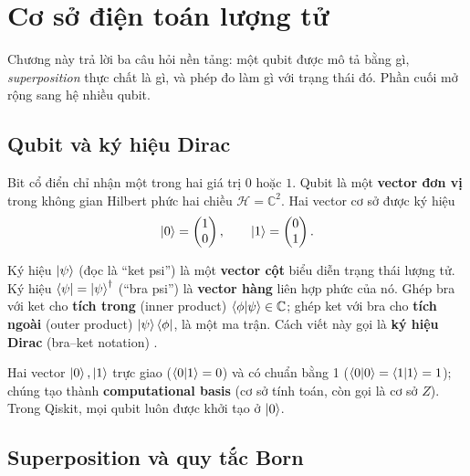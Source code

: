 \section{Cơ sở điện toán lượng tử}
\label{sec:basics}

Chương này trả lời ba câu hỏi nền tảng: một qubit được mô tả bằng gì, \emph{superposition} thực chất
là gì, và phép đo làm gì với trạng thái đó. Phần cuối mở rộng sang hệ nhiều qubit.

\subsection{Qubit và ký hiệu Dirac}

Bit cổ điển chỉ nhận một trong hai giá trị $0$ hoặc $1$. Qubit là một \textbf{vector đơn vị} trong
không gian Hilbert phức hai chiều $\mathcal{H} = \mathbb{C}^2$. Hai vector cơ sở được ký hiệu
\begin{equation}
  \ket{0} = \begin{pmatrix}1\\0\end{pmatrix}, \qquad
  \ket{1} = \begin{pmatrix}0\\1\end{pmatrix}.
  \label{eq:basis}
\end{equation}

\begin{definition}
Ký hiệu $\ket{\psi}$ (đọc là ``ket psi'') là một \textbf{vector cột} biểu diễn trạng thái lượng tử.
Ký hiệu $\bra{\psi} = \ket{\psi}^\dagger$ (``bra psi'') là \textbf{vector hàng} liên hợp phức của
nó. Ghép bra với ket cho \textbf{tích trong} (inner product) $\braket{\phi|\psi} \in \mathbb{C}$;
ghép ket với bra cho \textbf{tích ngoài} (outer product) $\ket{\psi}\bra{\phi}$, là một ma trận.
Cách viết này gọi là \textbf{ký hiệu Dirac} (bra--ket notation) \cite{nielsen2010}.
\end{definition}

Hai vector $\ket{0}, \ket{1}$ trực giao ($\braket{0|1} = 0$) và có chuẩn bằng 1
($\braket{0|0} = \braket{1|1} = 1$); chúng tạo thành \textbf{computational basis} (cơ sở tính
toán, còn gọi là cơ sở $Z$). Trong Qiskit, mọi qubit luôn được khởi tạo ở $\ket{0}$.

\subsection{Superposition và quy tắc Born}
\label{sec:born}

